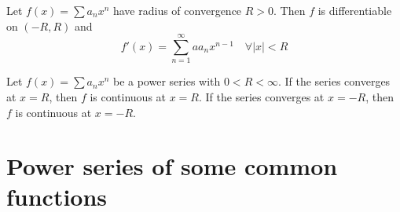 \documentclass{notes}
\begin{document}
\begin{theorem}{}
	Let $f(x) =  \sum a_n x^n  $ have radius of convergence $R > 0$. Then $f$ is
	differentiable on $(-R, R)$ and
	$$f'(x) = \sum_{n=1}^{\infty} a a_n x^{n-1}\quad \forall |x| < R$$
\end{theorem}
\begin{theorem}{}
	Let $f(x) =  \sum a_n x^n  $ be a power series with $0<  R<\infty$. If the series converges at $x = R$, then $f$ is continuous
	at $x = R$. If the series converges at $x = -R$, then $f$ is continuous
	at $x = -R$.
\end{theorem}



\appendix
\addappheadtotoc
\chapter{Power series of some common functions\cite{wiki:appendix}} 
\end{document}
